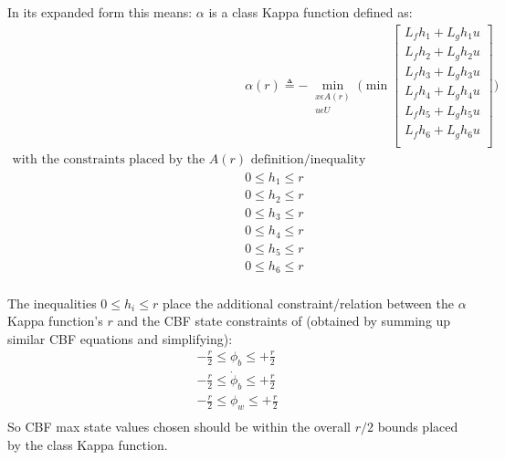 \documentclass[journal, onecolumn]{IEEEtran} %
\begin{document}
In its expanded form this means:
$\alpha$ is a class Kappa function defined as:
\begin{equation}
    \begin{aligned}
        \label{Ar_h_ineq}
        &\alpha(r) \triangleq - \min_{\begin{array} {c}\scriptstyle x \epsilon A(r) \\[-4pt]
                \scriptstyle u \epsilon U \end{array} }
        \Big( \min 
        \begin{bmatrix}
            L_fh_1 + L_gh_1u \\
            L_fh_2 + L_gh_2u \\
            L_fh_3 + L_gh_3u \\
            L_fh_4 + L_gh_4u \\
            L_fh_5 + L_gh_5u \\
            L_fh_6 + L_gh_6u \\
        \end{bmatrix}
        \Big) \\
        \text{with the constraints placed by the $A(r)$ definition/inequality} \\
        &0 \leq h_1 \leq r \\
        &0 \leq h_2 \leq r \\
        &0 \leq h_3 \leq r \\
        &0 \leq h_4 \leq r \\
        &0 \leq h_5 \leq r \\
        &0 \leq h_6 \leq r \\
    \end{aligned}
\end{equation}

The inequalities $0 \leq h_i \leq r$ place the additional constraint/relation between 
the $\alpha$ Kappa function's $r$ and the CBF state constraints of 
(obtained by summing up similar CBF equations and simplifying):
\begin{equation}
    \begin{aligned}
        -\frac{r}{2} \leq \phi_b \leq +\frac{r}{2} \\
        -\frac{r}{2} \leq \dot{\phi}_b \leq +\frac{r}{2} \\
        -\frac{r}{2} \leq \phi_w \leq +\frac{r}{2} \\
    \end{aligned}
\end{equation}
So CBF max state values chosen should be within the overall $r/2$ bounds placed by the class Kappa function. \\
\end{document}
